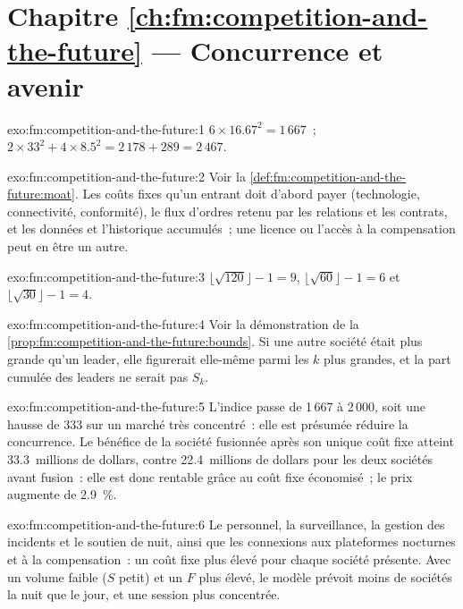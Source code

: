 \section*{Chapitre \ref{ch:fm:competition-and-the-future} --- Concurrence et avenir}

\begin{solution}{exo:fm:competition-and-the-future:1}
$6\times16.67^2=1\,667$~; $2\times33^2+4\times8.5^2=2\,178+289=2\,467$.
\end{solution}

\begin{solution}{exo:fm:competition-and-the-future:2}
Voir la \cref{def:fm:competition-and-the-future:moat}. Les coûts fixes qu'un entrant doit d'abord payer (technologie, connectivité, conformité), le flux d'ordres retenu par
les relations et les contrats, et les données et l'historique accumulés~; une licence ou l'accès à la compensation peut en être un autre.
\end{solution}

\begin{solution}{exo:fm:competition-and-the-future:3}
$\lfloor\sqrt{120}\rfloor-1=9$, $\lfloor\sqrt{60}\rfloor-1=6$ et $\lfloor\sqrt{30}\rfloor-1=4$.
\end{solution}

\begin{solution}{exo:fm:competition-and-the-future:4}
Voir la démonstration de la \cref{prop:fm:competition-and-the-future:bounds}. Si une autre société était plus grande qu'un leader, elle figurerait elle-même parmi les $k$
plus grandes, et la part cumulée des leaders ne serait pas $S_k$.
\end{solution}

\begin{solution}{exo:fm:competition-and-the-future:5}
L'indice passe de 1\,667 à 2\,000, soit une hausse de 333 sur un marché très concentré~: elle est présumée réduire la concurrence. Le bénéfice de la société fusionnée
après son unique coût fixe atteint 33.3~millions de dollars, contre 22.4~millions de dollars pour les deux sociétés avant fusion~: elle est donc rentable grâce au coût fixe économisé~; le
prix augmente de 2.9~\%.
\end{solution}

\begin{solution}{exo:fm:competition-and-the-future:6}
Le personnel, la surveillance, la gestion des incidents et le soutien de nuit, ainsi que les connexions aux plateformes nocturnes et à la compensation~: un coût fixe plus élevé pour
chaque société présente. Avec un volume faible ($S$ petit) et un $F$ plus élevé, le modèle prévoit moins de sociétés la nuit que le jour, et une
session plus concentrée.
\end{solution}

